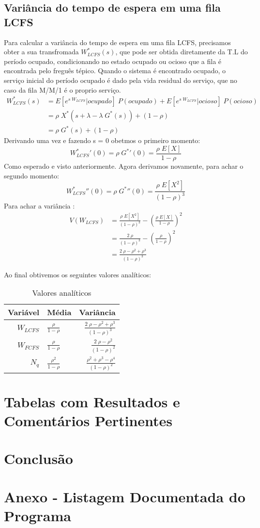 \documentclass[a4paper]{article}
\newcommand{\E}[1]{E\!\left[#1\right]}
\begin{document}
\subsection{Variância do tempo de espera em uma fila LCFS}
Para calcular a variância do tempo de espera em uma fila LCFS, precisamos obter
a sua transfromada \(W_{LCFS}^*(s)\), que pode ser obtida diretamente da T.L
do período ocupado, condicionando no estado ocupado ou ocioso que a fila  é encontrada pelo freguês tépico.
Quando o sistema é encontrado ocupado, o serviço inicial do período ocupado  é dado pela vida residual do
serviço, que no caso da fila M/M/1 é o proprio serviço.
\begin{align*}
    W_{LCFS}^*(s) &= \E{e^{s\;W_{LCFS}}|ocupado} \; P(ocupado) + \E{e^{s\;W_{LCFS}}|ocioso} \; P(ocioso)\\
    &= \rho\;  X^*(s+\lambda- \lambda\;G^*(s)) + (1-\rho)\\
    &=  \rho\; G^*(s) + (1-\rho)
\end{align*}
Derivando uma vez e fazendo s = 0 obetmos o primeiro momento:
\[
{W_{LCFS}^*}'(0) =  \rho\; {G^*}'(0) = \frac{ \rho\;\E{X}}{ 1-\rho}
\]
Como esperado e visto anteriormente. Agora derivamos novamente, para achar o segundo momento:
\[
{W_{LCFS}^*}''(0) =  \rho\; {G^*}''(0) = \frac{ \rho\;\E{X^2}}{(1-\rho)^3}
\]
Para achar a variância :
\begin{align*}
V(W_{LCFS})&= \frac{ \rho\;\E{X^2}}{(1-\rho)^3} - (\frac{ \rho\;\E{X}}{ 1-\rho})^2\\
&= \frac{ 2\; \rho}{(1-\rho)^3} - (\frac{ \rho}{ 1-\rho})^2\\
&=\frac{ 2\; \rho -\rho^2 + \rho^3}{(1-\rho)^3}
\end{align*}

Ao final obtivemos os seguintes valores analíticos:

\begin{table}[h]
\centering
\caption{Valores analíticos}
\vspace{0.9cm}
\begin{tabular}{r|lr}

Variável & Média & Variância \\ %
\hline                               %
\(W_{LCFS}\) & \(\frac{ \rho}{ 1-\rho}\)  & \(\frac{ 2\; \rho -\rho^2 + \rho^3}{(1-\rho)^3}\) \\
\(W_{FCFS}\) & \(\frac{ \rho}{ 1-\rho}\)  & \(\frac{2 \; \rho -\rho^2 }{(1 - \rho)^2}\) \\
\(N_q\)      & \(\frac{ \rho^2}{ 1-\rho}\)& \(\frac{\rho^2 + \rho^3 - \rho^4}{(1 - \rho)^2}\) \\

\end{tabular}
\end{table}
\newpage
\section{Tabelas com Resultados e Comentários Pertinentes}
\section{Conclusão}
\section{Anexo - Listagem Documentada do Programa}
\end{document}
